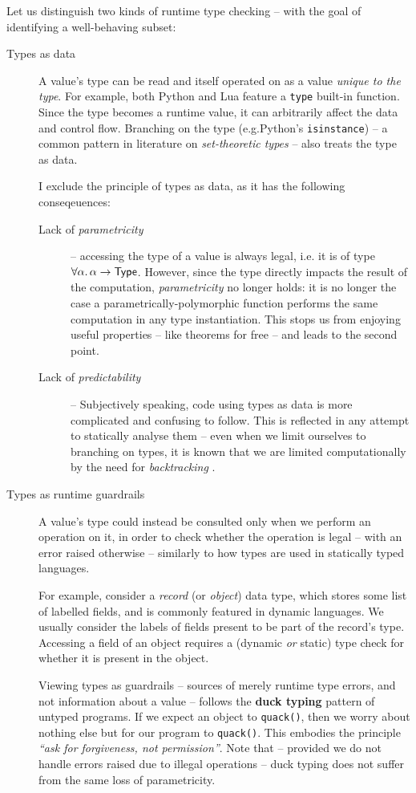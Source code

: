 Let us distinguish two kinds of runtime type checking -- with the goal of identifying a well-behaving subset: \begin{description}
    \item[Types as data] A value's type can be read and itself operated on as a value \emph{unique to the type}. For example, both Python and Lua feature a \texttt{type} built-in function. Since the type becomes a runtime value, it can arbitrarily affect the data and control flow. 
    Branching on the type (e.g.\@ Python's \texttt{isinstance}) -- a common pattern in literature on \emph{set-theoretic types} -- also treats the type as data. 
    
    I exclude the principle of types as data, as it has the following conseqeuences: \begin{description}
        \item[Lack of \emph{parametricity}] -- accessing the type of a value is always legal, i.e. it is of type $\forall \alpha \ldotp \alpha \to \textsf{Type}$. However, since the type directly impacts the result of the computation, \emph{parametricity} no longer holds: it is no longer the case a parametrically-polymorphic function performs the same computation in any type instantiation. This stops us from enjoying useful properties -- like theorems for free \cite{theorems-for-free} -- and leads to the second point.
        \item[Lack of \emph{predictability}] -- Subjectively speaking, code using types as data is more complicated and confusing to follow. This is reflected in any attempt to statically analyse them -- even when we limit ourselves to branching on types, it is known that we are limited computationally by the need for \emph{backtracking} \cite{polymorphic-set-theoretic-types}.
    \end{description}
    \item[Types as runtime guardrails] A value's type could instead be consulted only when we perform an operation on it, in order to check whether the operation is legal -- with an error raised otherwise -- similarly to how types are used in statically typed languages.     
    
    For example, consider a \emph{record} (or \emph{object}) data type, which stores some list of labelled fields, and is commonly featured in dynamic languages. 
    We usually consider the labels of fields present to be part of the record's type.
    Accessing a field of an object requires a (dynamic \emph{or} static) type check for whether it is present in the object.
    
    Viewing types as guardrails -- sources of merely runtime type errors, and not information about a value -- follows the \textbf{duck typing} pattern \cite{duck-typing} of untyped programs. If we expect an object to \texttt{quack()}, then we worry about nothing else but for our program to \texttt{quack()}. This embodies the principle \textit{\enquote{ask for forgiveness, not permission}}.
    Note that -- provided we do not handle errors raised due to illegal operations -- duck typing does not suffer from the same loss of parametricity.
\end{description}

